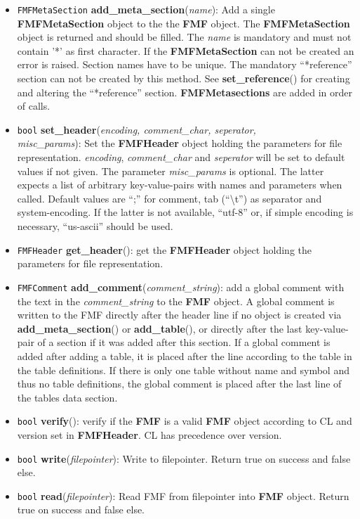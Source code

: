 \documentclass[10pt,utf8, mainlanguage=english]{ufcd-info}
\newcommand{\fret}[1]{{\texttt{#1}}}
\newcommand{\fcal}[2]{{\textbf{#1}}(\textit{#2})}
\newcommand{\fmfobj}[1]{{\textbf{\textsf{#1}}}}
\begin{document}
\begin{itemize}
	\item \fret{FMFMetaSection} \fcal{add\_meta\_section}{name}: Add a single \fmfobj{FMFMetaSection} object to the the \fmfobj{FMF} object. The \fmfobj{FMFMetaSection} object is returned and should be filled. The \textit{name} is mandatory and must not contain '*' as first character. If the \fmfobj{FMFMetaSection} can not be created an error is raised. Section names have to be unique. The mandatory \enquote{*reference} section can not be created by this method. See \fcal{set\_reference}{} for creating and altering the \enquote{*reference} section. \fmfobj{FMFMetasections} are added in order of calls.

	\item \fret{bool} \fcal{set\_header}{encoding, comment\_char, seperator,\\ misc\_params}: Set the \fmfobj{FMFHeader} object holding the parameters for file representation. \textit{encoding}, \textit{comment\_char} and \textit{seperator} will be set to default values if not given. The parameter \textit{misc\_params} is optional. The latter expects a list of arbitrary key-value-pairs with names and parameters when called. Default values are \enquote{;} for comment, tab (\enquote{\textbackslash t}) as separator and system-encoding. If the latter is not available, \enquote{utf-8} or, if simple encoding is necessary, \enquote{us-ascii} should be used.

	\item \fret{FMFHeader} \fcal{get\_header}{}: get the \fmfobj{FMFHeader} object holding the parameters for file representation.

	\item \fret{FMFComment} \fcal{add\_comment}{comment\_string}: add a global comment with the text in the \textit{comment\_string} to the \fmfobj{FMF} object. A global comment is written to the FMF directly after the header line if no object is created via \fcal{add\_meta\_section}{} or \fcal{add\_table}{}, or directly after the last key-value-pair of a section if it was added after this section. If a global comment is added after adding a table, it is placed after the line according to the table in the table definitions. If there is only one table without name and symbol and thus no table definitions, the global comment is placed after the last line of the tables data section.

	\item \fret{bool} \fcal{verify}{}: verify if the \fmfobj{FMF} is a valid \fmfobj{FMF} object according to CL and version set in \fmfobj{FMFHeader}. CL has precedence over version.

	\item \fret{bool} \fcal{write}{filepointer}: Write to filepointer. Return true on success and false else.

	\item \fret{bool} \fcal{read}{filepointer}: Read FMF from filepointer into \fmfobj{FMF} object. Return true on success and false else.
\end{itemize}
\end{document}

